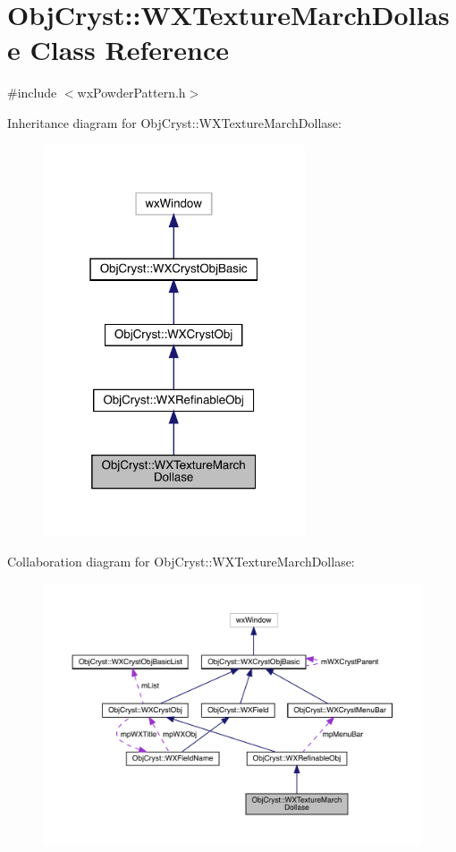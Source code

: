 \hypertarget{class_obj_cryst_1_1_w_x_texture_march_dollase}{}\section{Obj\+Cryst\+::W\+X\+Texture\+March\+Dollase Class Reference}
\label{class_obj_cryst_1_1_w_x_texture_march_dollase}


{\ttfamily \#include $<$wx\+Powder\+Pattern.\+h$>$}



Inheritance diagram for Obj\+Cryst\+::W\+X\+Texture\+March\+Dollase\+:
\nopagebreak
\begin{figure}[H]
\begin{center}
\leavevmode
\includegraphics[width=220pt]{class_obj_cryst_1_1_w_x_texture_march_dollase__inherit__graph}
\end{center}
\end{figure}


Collaboration diagram for Obj\+Cryst\+::W\+X\+Texture\+March\+Dollase\+:
\nopagebreak
\begin{figure}[H]
\begin{center}
\leavevmode
\includegraphics[width=350pt]{class_obj_cryst_1_1_w_x_texture_march_dollase__coll__graph}
\end{center}
\end{figure}
